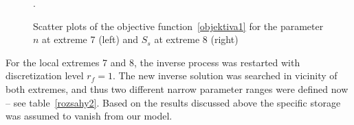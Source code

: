 \documentclass[review]{elsarticle}
\begin{document}
\begin{figure}
\caption{Scatter plots of the objective function~\eqref{objektiva1} for the parameter $n$ at extreme 7 (left)  and $S_s$ at extreme 8  (right)}.
\label{objfnc6.2}
\end{figure}

For the local extremes 7 and 8, the inverse process was restarted with discretization level $r_f=1$. 
The new inverse solution was searched in  vicinity of both extremes, and thus two different narrow parameter ranges were defined now -- see table~\ref{rozsahy2}. Based on the results discussed above the specific storage was assumed to vanish from our model. 
\end{document}
